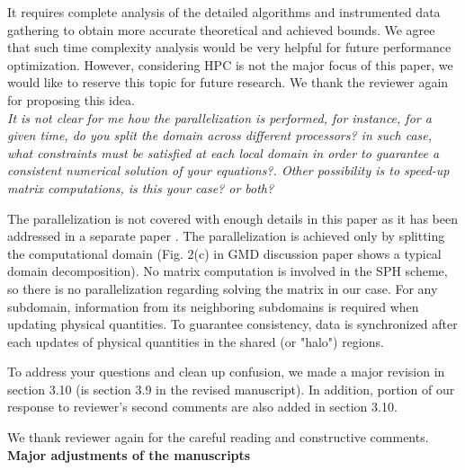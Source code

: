 \documentclass{article}
\begin{document}
It requires complete analysis of the detailed algorithms and instrumented data gathering to obtain  more accurate theoretical and achieved bounds. We agree that such  time complexity analysis would be very helpful for future performance optimization. However, considering HPC is not the major focus of this paper, we would like to reserve this topic for future research. We thank the reviewer again for proposing this idea.\\[3pt]

\textit{It is not clear for me how the parallelization is performed, for instance, for a given time, do you split the domain across different processors? in such case, what constraints must be satisfied at each local domain in order to guarantee a consistent numerical solution of your equations?. Other possibility is to speed-up matrix computations, is this your case? or both?}

The parallelization is not covered with enough details in this paper as it has been addressed in a separate paper \cite {cao2017data}.  The parallelization is achieved only by splitting the computational domain (Fig. 2(c) in GMD discussion paper shows a typical domain decomposition). No matrix computation is involved in the SPH scheme, so there is no parallelization regarding solving the matrix in our case.
For any subdomain, information from its neighboring subdomains is required when updating physical quantities.   To guarantee consistency, data is synchronized after each updates of physical quantities in the shared (or "halo") regions.

To address your questions and clean up confusion, we made a major revision in section 3.10 (is section 3.9 in the revised manuscript). In addition, portion of our response to reviewer's second comments are also added in section 3.10.
 
We thank reviewer again for the careful reading and constructive comments.\\[12pt]

\textbf{\large Major adjustments of the manuscripts}
\end{document}
